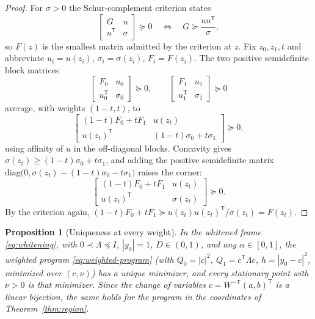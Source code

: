 ﻿\documentclass[11pt,onecolumn]{IEEEtran}
\newtheorem{proposition}[theorem]{Proposition}
\begin{document}
\begin{proof}
For $\sigma>0$ the Schur-complement criterion states
\[
\begin{bmatrix}G&u\\ u^{\mathsf T}&\sigma\end{bmatrix}\succeq0
\quad\Longleftrightarrow\quad
G\succeq\frac{uu^{\mathsf T}}{\sigma},
\]
so $F(z)$ is the smallest matrix admitted by the criterion at $z$.
Fix $z_0,z_1,t$ and abbreviate $u_i=u(z_i)$, $\sigma_i=\sigma(z_i)$,
$F_i=F(z_i)$. The two positive semidefinite block matrices
\[
\begin{bmatrix}F_0&u_0\\ u_0^{\mathsf T}&\sigma_0\end{bmatrix}
\succeq0,
\qquad
\begin{bmatrix}F_1&u_1\\ u_1^{\mathsf T}&\sigma_1\end{bmatrix}
\succeq0
\]
average, with weights $(1-t,t)$, to
\[
\begin{bmatrix}
(1-t)F_0+tF_1&u(z_t)\\
u(z_t)^{\mathsf T}&(1-t)\sigma_0+t\sigma_1
\end{bmatrix}\succeq0,
\]
using affinity of $u$ in the off-diagonal blocks. Concavity gives
$\sigma(z_t)\ge(1-t)\sigma_0+t\sigma_1$, and adding the positive
semidefinite matrix
$\mathrm{diag}\bigl(0,\sigma(z_t)-(1-t)\sigma_0-t\sigma_1\bigr)$
raises the corner:
\[
\begin{bmatrix}
(1-t)F_0+tF_1&u(z_t)\\
u(z_t)^{\mathsf T}&\sigma(z_t)
\end{bmatrix}\succeq0 .
\]
By the criterion again,
$(1-t)F_0+tF_1\succeq u(z_t)u(z_t)^{\mathsf T}/\sigma(z_t)=F(z_t)$.
\end{proof}

\begin{proposition}[Uniqueness at every weight]\label{prop:uniq}
In the whitened frame \eqref{eq:whitening}, with $0\prec\Lambda\preceq
I$, $|y_0|=1$, $D\in(0,1)$, and any $\alpha\in[0,1]$, the weighted
program \eqref{eq:weighted-program} (with $Q_0=|c|^2$,
$Q_1=c^{\mathsf T}\Lambda c$, $h=|y_0-c|^2$, minimized over $(c,\nu)$)
has a unique minimizer, and every stationary point with $\nu>0$ is that
minimizer. Since the change of variables
$c=W^{-\mathsf T}(a,b)^{\mathsf T}$ is a linear bijection, the same
holds for the program in the coordinates of
Theorem~\ref{thm:region}.
\end{proposition}
\end{document}
